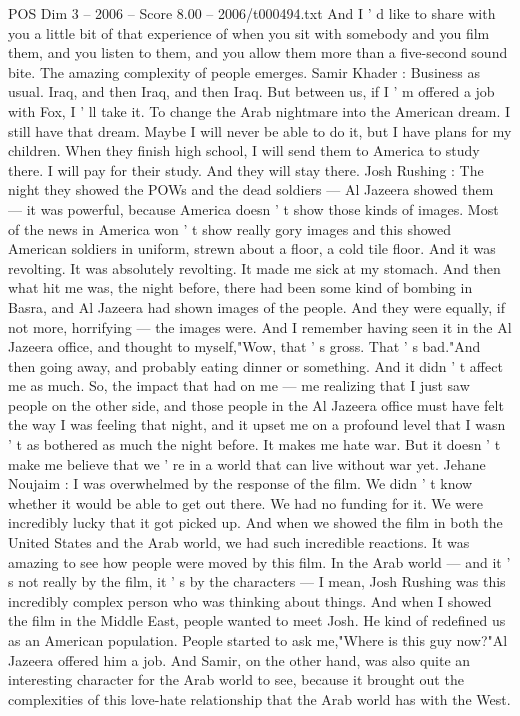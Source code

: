 \begin{textsample}{POS Dim 3 – 2006 – Score 8.00 – 2006/t000494.txt}
And I ' d like to share with you a little bit of that experience of when you sit with somebody and you film them, and you listen to them, and you allow them more than a five-second sound bite.
The amazing complexity of people emerges.
Samir Khader : Business as usual.
Iraq, and then Iraq, and then Iraq.
But between us, if I ' m offered a job with Fox, I ' ll take it.
To change the Arab nightmare into the American dream.
I still have that dream.
Maybe I will never be able to do it, but I have plans for my children.
When they finish high school, I will send them to America to study there.
I will pay for their study.
And they will stay there.
Josh Rushing : The night they showed the POWs and the dead soldiers — Al Jazeera showed them — it was powerful, because America doesn ' t show those kinds of images.
Most of the news in America won ' t show really gory images and this showed American soldiers in uniform, strewn about a floor, a cold tile floor.
And it was revolting.
It was absolutely revolting.
It made me sick at my stomach.
And then what hit me was, the night before, there had been some kind of bombing in Basra, and Al Jazeera had shown images of the people.
And they were equally, if not more, horrifying — the images were.
And I remember having seen it in the Al Jazeera office, and thought to myself,"Wow, that ' s gross.
That ' s bad."And then going away, and probably eating dinner or something.
And it didn ' t affect me as much.
So, the impact that had on me — me realizing that I just saw people on the other side, and those people in the Al Jazeera office must have felt the way I was feeling that night, and it upset me on a profound level that I wasn ' t as bothered as much the night before.
It makes me hate war.
But it doesn ' t make me believe that we ' re in a world that can live without war yet.
Jehane Noujaim : I was overwhelmed by the response of the film.
We didn ' t know whether it would be able to get out there.
We had no funding for it.
We were incredibly lucky that it got picked up.
And when we showed the film in both the United States and the Arab world, we had such incredible reactions.
It was amazing to see how people were moved by this film.
In the Arab world — and it ' s not really by the film, it ' s by the characters — I mean, Josh Rushing was this incredibly complex person who was thinking about things.
And when I showed the film in the Middle East, people wanted to meet Josh.
He kind of redefined us as an American population.
People started to ask me,"Where is this guy now?"Al Jazeera offered him a job.
And Samir, on the other hand, was also quite an interesting character for the Arab world to see, because it brought out the complexities of this love-hate relationship that the Arab world has with the West.

\end{textsample}
